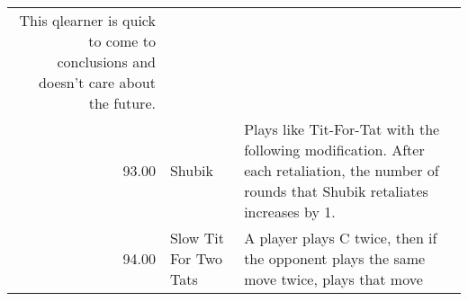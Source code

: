 \begin{tabular}{rll}
	This qlearner is quick to come to conclusions and doesn't care about the future.                                                                                                                                                                                                                                                                                                                                                                                                                                                                                                                                                                                                                                                                                                                                                                                                                                                          \\
	93.00  & Shubik                      & Plays like Tit-For-Tat with the following modification. After
	each retaliation, the number of rounds that Shubik retaliates
	increases by 1.                                                                                                                                                                                                                                                                                                                                                                                                                                                                                                                                                                                                                                                                                                                                                                                                                                                                      \\
	94.00  & Slow Tit For Two Tats       & A player plays C twice, then if the opponent plays the same move twice,
	plays that move                                                                                                                                                                                                                                                                                                                                                                                                                                                                                                                                                                                                                                                                                                                                                                                                                                                                                                                             \\

\end{tabular}
